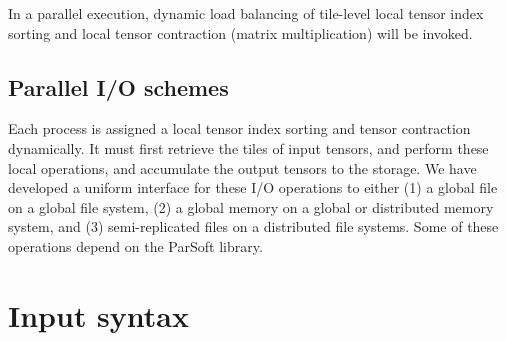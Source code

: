 In a parallel execution, dynamic load balancing of tile-level local tensor index sorting and local 
tensor contraction (matrix multiplication) will be invoked.

\subsection{Parallel I/O schemes}

Each process is assigned a local tensor index sorting and tensor contraction dynamically.  It must first
retrieve the tiles of input tensors, and perform these local operations, and accumulate the output
tensors to the storage.  We have developed a uniform interface for these I/O operations to either
(1) a global file on a global file system, (2) a global memory on a global or distributed memory system,
and (3) semi-replicated files on a distributed file systems.  Some of these operations depend on 
the ParSoft library.

\section{Input syntax}
\label{sec:inputsyntax}

